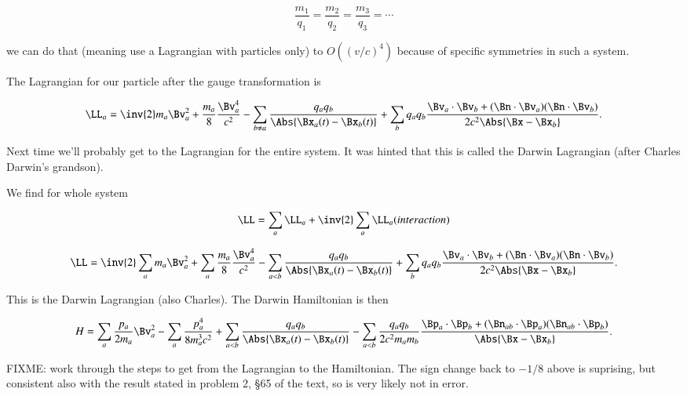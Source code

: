 \begin{equation}\label{eqn:relativisticElectrodynamicsL26:10}
\frac{m_1}{q_1} = \frac{m_2}{q_2} = \frac{m_3}{q_3} = \cdots
\end{equation}

we can do that (meaning use a Lagrangian with particles only) to $O((v/c)^4)$ because of specific symmetries in such a system.

The Lagrangian for our particle after the gauge transformation is

\begin{equation}\label{eqn:relativisticElectrodynamicsL26:30}
\LL_a = \inv{2} m_a \Bv_a^2 + \frac{m_a}{8} \frac{\Bv_a^4}{c^2} 
-\sum_{b \ne a} \frac{q_a q_b}{\Abs{\Bx_a(t) - \Bx_b(t)}}
+\sum_b q_a q_b \frac{\Bv_a \cdot \Bv_b + (\Bn \cdot \Bv_a) (\Bn \cdot \Bv_b)}{2 c^2 \Abs{\Bx - \Bx_b} }.
\end{equation}

Next time we'll probably get to the Lagrangian for the entire system.  It was hinted that this is called the Darwin Lagrangian (after Charles Darwin's grandson).

We find for whole system

\begin{equation}\label{eqn:relativisticElectrodynamicsL26:50}
\LL =  \sum_a \LL_a + \inv{2} \sum_a \LL_a (interaction)
\end{equation}

\begin{equation}\label{eqn:relativisticElectrodynamicsL26:70}
\LL = \inv{2} \sum_a m_a \Bv_a^2 + \sum_a \frac{m_a}{8} \frac{\Bv_a^4}{c^2} 
-\sum_{ a < b} \frac{q_a q_b}{\Abs{\Bx_a(t) - \Bx_b(t)}}
+\sum_b q_a q_b \frac{\Bv_a \cdot \Bv_b + (\Bn \cdot \Bv_a) (\Bn \cdot \Bv_b)}{2 c^2 \Abs{\Bx - \Bx_b} }.
\end{equation}

This is the Darwin Lagrangian (also Charles).  The Darwin Hamiltonian is then

\begin{equation}\label{eqn:relativisticElectrodynamicsL26:90}
H = \sum_a \frac{p_a}{2 m_a} \Bv_a^2 - \sum_a \frac{p_a^4}{8 m_a^3 c^2} 
+\sum_{ a < b} \frac{q_a q_b}{\Abs{\Bx_a(t) - \Bx_b(t)}}
- \sum_{ a < b } \frac{q_a q_b}{ 2 c^2 m_a m_b } \frac{\Bp_a \cdot \Bp_b + (\Bn_{a b} \cdot \Bp_a) (\Bn_{ a b } \cdot \Bp_b)}{\Abs{\Bx - \Bx_b} }.
\end{equation}

FIXME: work through the steps to get from the Lagrangian to the Hamiltonian.  The sign change back to $-1/8$ above is suprising, but consistent also with the result stated in problem 2, \S 65 of the text, so is very likely not in error.

